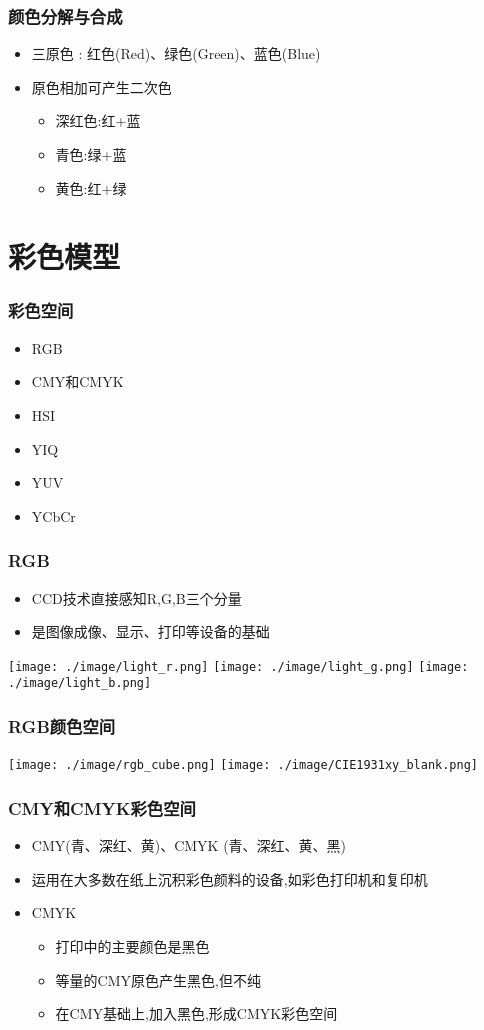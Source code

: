 \documentclass{beamer}
\begin{document}
\begin{frame}
\frametitle{颜色分解与合成}
\label{sec-1-4}

\begin{itemize}
\item 三原色 :  红色(Red)、绿色(Green)、蓝色(Blue)
\item 原色相加可产生二次色
\begin{itemize}
\item 深红色:红+蓝
\item 青色:绿+蓝
\item 黄色:红+绿
\end{itemize}
\end{itemize}
\end{frame}
\section{彩色模型}
\label{sec-2}
\begin{frame}
\frametitle{彩色空间}
\label{sec-2-1}

\begin{itemize}
\item RGB
\item CMY和CMYK
\item HSI
\item YIQ
\item YUV
\item YCbCr
\end{itemize}
\end{frame}
\begin{frame}
\frametitle{RGB}
\label{sec-2-2}

\begin{itemize}
\item CCD技术直接感知R,G,B三个分量
\item 是图像成像、显示、打印等设备的基础
\end{itemize}
\texttt{[image: ./image/light\_r.png]}
\texttt{[image: ./image/light\_g.png]}
\texttt{[image: ./image/light\_b.png]}
\end{frame}
\begin{frame}
\frametitle{RGB颜色空间}
\label{sec-2-3}

\texttt{[image: ./image/rgb\_cube.png]}
\texttt{[image: ./image/CIE1931xy\_blank.png]}
\end{frame}
\begin{frame}
\frametitle{CMY和CMYK彩色空间}
\label{sec-2-4}

\begin{itemize}
\item CMY(青、深红、黄)、CMYK (青、深红、黄、黑)
\item 运用在大多数在纸上沉积彩色颜料的设备,如彩色打印机和复印机
\item CMYK
\begin{itemize}
\item 打印中的主要颜色是黑色
\item 等量的CMY原色产生黑色,但不纯
\item 在CMY基础上,加入黑色,形成CMYK彩色空间
\end{itemize}
\end{itemize}
\end{frame}
\end{document}
